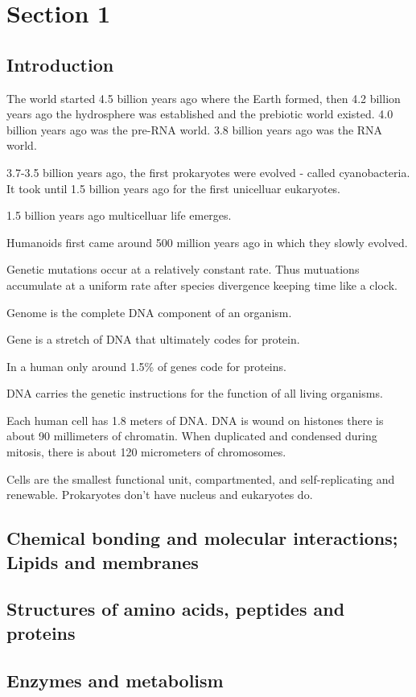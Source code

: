 \documentclass[../introbio.tex]{subfiles}
\begin{document}
\chapter{Section 1}
\section{Introduction}
The world started 4.5 billion years ago where the Earth formed, then 4.2 billion years ago the hydrosphere was established and the prebiotic world existed. 4.0 billion years ago was the pre-RNA world. 3.8 billion years ago was the RNA world.

3.7-3.5 billion years ago, the first prokaryotes were evolved - called cyanobacteria. It took until 1.5 billion years ago for the first unicelluar eukaryotes. 

1.5 billion years ago multicelluar life emerges. 

Humanoids first came around 500 million years ago in which they slowly evolved.

Genetic mutations occur at a relatively constant rate. Thus mutuations accumulate at a uniform rate after species divergence keeping time like a clock.

Genome is the complete DNA component of an organism.

Gene is a stretch of DNA that ultimately codes for protein.

In a human only around 1.5\% of genes code for proteins.

DNA carries the genetic instructions for the function of all living organisms.

Each human cell has 1.8 meters of DNA. DNA is wound on histones there is about 90 millimeters of chromatin. When duplicated and condensed during mitosis, there is about 120 micrometers of chromosomes. 

Cells are the smallest functional unit, compartmented, and self-replicating and renewable. Prokaryotes don't have nucleus and eukaryotes do.


\section{Chemical bonding and molecular interactions; Lipids and membranes}
\section{Structures of amino acids, peptides and proteins}
\section{Enzymes and metabolism}
\end{document}
